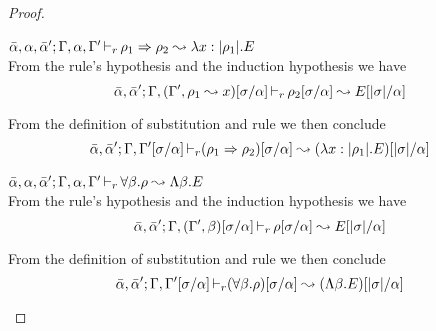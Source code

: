 \begin{proof}
\begin{description}
\setlength{\itemsep}{1em}
\item[\fbox{\texttt{(R-IAbs)}}]\quad$\bar{\alpha},\alpha,\bar{\alpha}';\Gamma,\alpha,\Gamma'
\mathop{\vdash_{r}} \rho_1 \Rightarrow \rho_2 \leadsto \lambda x:|\rho_1|.E$ \ \\
  From the rule's hypothesis and the induction hypothesis we have
\begin{equation*}
\bar{\alpha},\bar{\alpha}';\Gamma,(\Gamma',\rho_1\leadsto x)[\sigma/\alpha] \mathop{\vdash_{r}} \rho_2[\sigma/\alpha] \leadsto E[|\sigma|/\alpha]
\end{equation*}

  From the definition of substitution and rule  we then conclude
\begin{equation*}
\bar{\alpha},\bar{\alpha}';\Gamma,\Gamma'[\sigma/\alpha] \mathop{\vdash_{r}} (\rho_1 \Rightarrow \rho_2)[\sigma/\alpha] \leadsto (\lambda x:|\rho_1|.E)[|\sigma|/\alpha]
\end{equation*}

\item[\fbox{\texttt{(R-TAbs)}}]\quad$\bar{\alpha},\alpha,\bar{\alpha}';\Gamma,\alpha,\Gamma'
\mathop{\vdash_{r}} \forall\beta.\rho \leadsto \Lambda\beta.E$ \ \\
  From the rule's hypothesis and the induction hypothesis we have
\begin{equation*}
\bar{\alpha},\bar{\alpha}';\Gamma,(\Gamma',\beta)[\sigma/\alpha] \mathop{\vdash_{r}} \rho[\sigma/\alpha] \leadsto E[|\sigma|/\alpha]
\end{equation*}

  From the definition of substitution and rule  we then conclude
\begin{equation*}
\bar{\alpha},\bar{\alpha}';\Gamma,\Gamma'[\sigma/\alpha] \mathop{\vdash_{r}} (\forall\beta.\rho)[\sigma/\alpha] \leadsto (\Lambda\beta.E)[|\sigma|/\alpha]
\end{equation*}


\end{description}
\end{proof}
